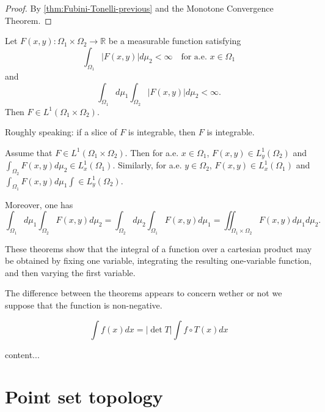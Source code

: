 \documentclass{article}
\theoremstyle{definition}
\numberwithin{equation}{section}
\newcommand{\R}{\mathbb{R}}
\begin{document}
	\begin{proof}
		By \cref{thm:Fubini-Tonelli-previous} and the Monotone Convergence Theorem.
	\end{proof}
	
	\begin{thm}
		Let $F(x,y):\Omega_1\times \Omega_2\to\R$ be a measurable function satisfying
		\[\int_{\Omega_1}|F(x,y)|d\mu_2<\infty\quad\text{for a.e. } x\in\Omega_1\]
		and
		\[\int_{\Omega_1}d\mu_1\int_{\Omega_2}|F(x,y)|d\mu_2<\infty.\]
		Then $F\in L^1(\Omega_1\times \Omega_2)$.
		
		{\color{persiangreen}Roughly speaking: if a slice of $F$ is integrable, then $F$ is integrable.}
	\end{thm}
	
	\begin{thm}
		Assume that $F\in L^1(\Omega_1\times\Omega_2)$. Then for a.e. $x\in\Omega_1$, $F(x,y)\in L^1_y(\Omega_2)$ and $\int_{\Omega_2}F(x,y)d\mu_2\in L^1_x(\Omega_1)$. Similarly, for a.e. $y\in\Omega_2$, $F(x,y)\in L^1_x(\Omega_1)$ and $\int_{\Omega_1}F(x,y)d\mu_1\int\in L^1_y(\Omega_2)$.
		
		Moreover, one has
		\[\int_{\Omega_1}d\mu_1\int_{\Omega_2}F(x,y)d\mu_2=\int_{\Omega_2}d\mu_2\int_{\Omega_1}F(x,y)d\mu_1=\iint_{\Omega_1\times\Omega_2}F(x,y)d\mu_1d\mu_2.\]
	\end{thm}
	
	\begin{remark}
		These theorems show that the integral of a function over a cartesian product may be obtained by fixing one variable, integrating the resulting one-variable function, and then varying the first variable.
	\end{remark}
	\begin{remark}
		The difference between the theorems appears to concern wether or not we suppose that the function is non-negative.
	\end{remark}
	
	\begin{thm}[2.44]
		\[\int f(x)dx=|\det T|\int f\circ T(x)dx\]
	\end{thm}
	\begin{thm}[2.47, diffeomorphisms]
		content...
	\end{thm}
	
	\clearpage
	
	\section{Point set topology}
\end{document}

